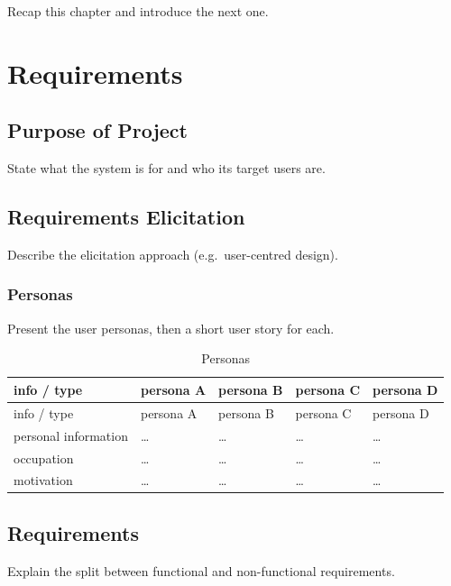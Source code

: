 \documentclass[
  12pt,
  a4paper,
]{report}
\begin{document}
Recap this chapter and introduce the next one.

\chapter{Requirements}\label{requirements}

\section{Purpose of Project}\label{purpose-of-project}

State what the system is for and who its target users are.

\section{Requirements Elicitation}\label{requirements-elicitation}

Describe the elicitation approach (e.g.~user-centred design).

\subsection{Personas}\label{personas}

Present the user personas, then a short user story for each.

\begin{longtable}[]{@{}lllll@{}}
\caption{Personas}\tabularnewline
\toprule\noalign{}
info / type & persona A & persona B & persona C & persona D \\
\midrule\noalign{}
\endfirsthead
\toprule\noalign{}
info / type & persona A & persona B & persona C & persona D \\
\midrule\noalign{}
\endhead
\bottomrule\noalign{}
\endlastfoot
personal information & \ldots{} & \ldots{} & \ldots{} & \ldots{} \\
occupation & \ldots{} & \ldots{} & \ldots{} & \ldots{} \\
motivation & \ldots{} & \ldots{} & \ldots{} & \ldots{} \\
\end{longtable}

\section{Requirements}\label{requirements-1}

Explain the split between functional and non-functional requirements.
\end{document}

